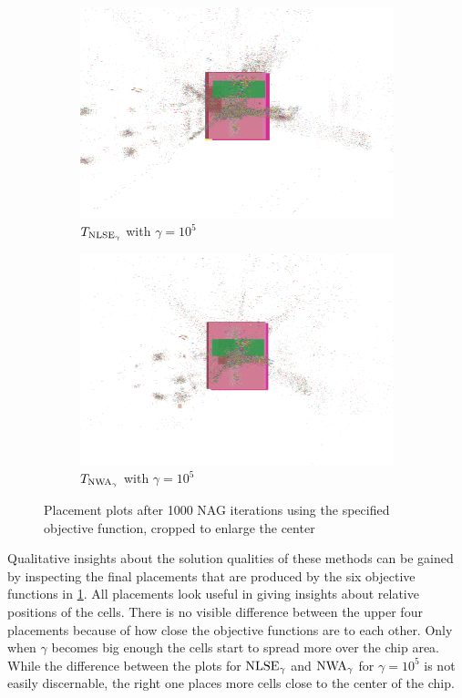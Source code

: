 \begin{figure}[p]
 \begin{subfigure}{.48\textwidth}
  \includegraphics[width=\textwidth, frame]{baseline/convergence_Chip1_LSE_100000_gamma.png}  
  \caption{\(T_{\operatorname{NLSE}_\gamma}\) with \(\gamma = 10^5\)}
 \end{subfigure}
 \hfill
 \begin{subfigure}{.48\textwidth}
  \includegraphics[width=\textwidth, frame]{baseline/convergence_Chip1_WA_100000_gamma.png}  
  \caption{\(T_{\operatorname{NWA}_\gamma}\) with \(\gamma = 10^5\)}
 \end{subfigure}
 
 \caption{Placement plots after 1000 NAG iterations using the specified objective function, cropped to enlarge the center}
 \label{fig:baseline_placement_plots}
\end{figure}

Qualitative insights about the solution qualities of these methods
can be gained by inspecting the final placements
that are produced by the six objective functions in \cref{fig:baseline_placement_plots}.
All placements look useful in giving insights about relative positions of the cells.
There is no visible difference between the upper four placements
because of how close the objective functions are to each other.
Only when \(\gamma\) becomes big enough the cells start to spread more over the chip area.
While the difference between the plots for \(\operatorname{NLSE}_\gamma\) and \(\operatorname{NWA}_\gamma\) for \(\gamma = 10^5\)
is not easily discernable, the right one places more cells close to the center
of the chip.

